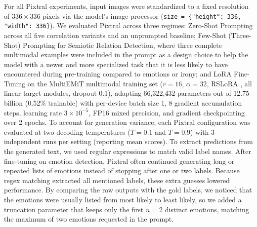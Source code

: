 For all Pixtral experiments, input images were standardized to a fixed resolution of $336 \times 336$ pixels via the model's image processor (\texttt{size = \{"height": 336, "width": 336\}}). We evaluated Pixtral across three regimes: Zero-Shot Prompting across all five correlation variants and an unprompted baseline; Few-Shot (Three-Shot) Prompting \cite{brown2020language} for Semiotic Relation Detection, where three complete multimodal examples were included in the prompt as a design choice to help the model with a newer and more specialized task that it is less likely to have encountered during pre-training compared to emotions or irony; and LoRA Fine-Tuning on the MultiEMiT multimodal training set ($r=16$, $\alpha=32$, RSLoRA \cite{hu2021lora, kalajdzievski2023rank}, all linear target modules, dropout $0.1$), adapting 66,322,432 parameters out of 12.75 billion (0.52\% trainable) with per-device batch size 1, 8 gradient accumulation steps, learning rate $3 \times 10^{-5}$, FP16 mixed precision, and gradient checkpointing over 2 epochs. To account for generation variance, each Pixtral configuration was evaluated at two decoding temperatures ($T=0.1$ and $T=0.9$) with 3 independent runs per setting (reporting mean scores). To extract predictions from the generated text, we used regular expressions to match valid label names. After fine-tuning on emotion detection, Pixtral often continued generating long or repeated lists of emotions instead of stopping after one or two labels. Because regex matching extracted all mentioned labels, these extra guesses lowered performance. By comparing the raw outputs with the gold labels, we noticed that the emotions were usually listed from most likely to least likely, so we added a truncation parameter that keeps only the first $n=2$ distinct emotions, matching the maximum of two emotions requested in the prompt.